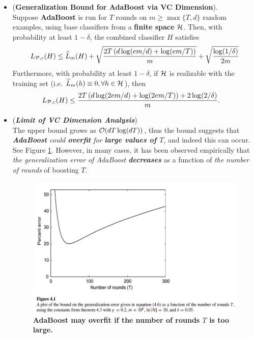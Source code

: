 \documentclass[11pt]{article}
\begin{document}
\begin{itemize}
\item \begin{theorem} \label{thm: growth_fun_adaboost}  (\textbf{Generalization Bound for AdaBoost via VC Dimension}). \citep{schapire2012boosting}\\
Suppose \textbf{AdaBoost} is run for $T$ rounds on $m \ge \max\{T, d\}$ random examples, using base classifiers from a \textbf{finite space} ${\mathcal H}$. Then, with probability at least $1 - \delta$, the combined classifier $H$ satisfies
\begin{align}
L_{{\mathcal P}, c}(H) \le \widehat{L}_{m}(H) + \sqrt{\frac{2 T\left( d\log(em/d) + \log(em/T) \right)}{m}} +\sqrt{\frac{\log(1/\delta)}{2m}} \label{ineqn: generalization_bound_growth_number_adaboost}
\end{align} Furthermore, with probability at least $1 - \delta$, if ${\mathcal H}$ is realizable with the training set (i.e. $\widehat{L}_{m}(h) \equiv 0, \forall h\in {\mathcal H}$), then
\begin{align}
L_{{\mathcal P}, c}(H) &\le \frac{2 T\left( d\log(2em/d) + \log(2em/T) \right) + 2\log(2/\delta)}{m}. \label{ineqn: pac_sample_complexity_consistency}
\end{align}
\end{theorem}

\item \begin{remark}(\emph{\textbf{Limit of VC Dimension Analysis}})\\
The upper bound grows as ${\mathcal O}(dT \log(dT))$, thus the bound suggests that \emph{\textbf{AdaBoost} could \textbf{overfit} for \textbf{large values of $T$}}, and indeed this can occur. See Figure \ref{fig: overfitting_adaboost}. However, in many cases, it has been observed empirically that \emph{the generalization error of AdaBoost \textbf{decreases}} as a function of \emph{the number of rounds} of boosting $T$.
\end{remark}

\begin{figure}
\begin{minipage}[t]{1\linewidth}
  \centering
  \centerline{\includegraphics[scale = 0.4]{overfitting_adaboost.png}}
\end{minipage}
\caption{\footnotesize{\textbf{AdaBoost may overfit if the number of rounds $T$ is too large. \citep{schapire2012boosting}}}}
\label{fig: overfitting_adaboost}
\end{figure}



\end{itemize}
\end{document}

